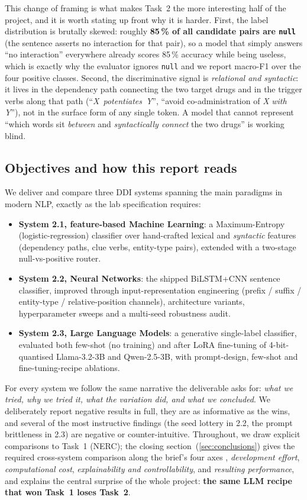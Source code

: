 \documentclass[a4paper,11pt]{article}
\begin{document}
This change of framing is what makes Task~2 the more interesting half of
the project, and it is worth stating up front why it is harder. First,
the label distribution is brutally skewed: roughly \textbf{85\,\% of all
candidate pairs are \texttt{null}} (the sentence asserts no interaction
for that pair), so a model that simply answers ``no interaction''
everywhere already scores 85\,\% accuracy while being useless, which
is exactly why the evaluator ignores \texttt{null} and we report
macro-F1 over the four positive classes. Second, the discriminative
signal is \emph{relational and syntactic}: it lives in the dependency
path connecting the two target drugs and in the trigger verbs along that
path (``\textit{X}~\emph{potentiates}~\textit{Y}'', ``avoid
co-administration of \textit{X} \emph{with} \textit{Y}''), not in the
surface form of any single token. A model that cannot represent
``which words sit \emph{between} and \emph{syntactically connect} the
two drugs'' is working blind.

\subsection{Objectives and how this report reads}
We deliver and compare three DDI systems spanning the main paradigms in
modern NLP, exactly as the lab specification requires:
\begin{itemize}
    \item \textbf{System 2.1, feature-based Machine Learning}: a
    Maximum-Entropy (logistic-regression) classifier over hand-crafted
    lexical and \emph{syntactic} features (dependency paths, clue verbs,
    entity-type pairs), extended with a two-stage null-vs-positive
    router.
    \item \textbf{System 2.2, Neural Networks}: the shipped
    BiLSTM+CNN sentence classifier, improved through
    input-representation engineering (prefix / suffix / entity-type /
    relative-position channels), architecture variants, hyperparameter
    sweeps and a multi-seed robustness audit.
    \item \textbf{System 2.3, Large Language Models}: a generative
    single-label classifier, evaluated both few-shot (no training) and
    after LoRA fine-tuning of 4-bit-quantised Llama-3.2-3B and
    Qwen-2.5-3B, with prompt-design, few-shot and fine-tuning-recipe
    ablations.
\end{itemize}
For every system we follow the same narrative the deliverable asks for:
\emph{what we tried, why we tried it, what the variation did, and what
we concluded}. We deliberately report negative results in full, they
are as informative as the wins, and several of the most instructive
findings (the seed lottery in 2.2, the prompt brittleness in 2.3) are
negative or counter-intuitive. Throughout, we draw explicit comparisons
to Task~1 (NERC); the closing section~(\ref{sec:conclusions}) gives the
required cross-system comparison along the brief's four axes ,
\emph{development effort}, \emph{computational cost}, \emph{explainability
and controllability}, and \emph{resulting performance}, and explains
the central surprise of the whole project: \textbf{the same LLM recipe
that won Task~1 loses Task~2}.
\end{document}
